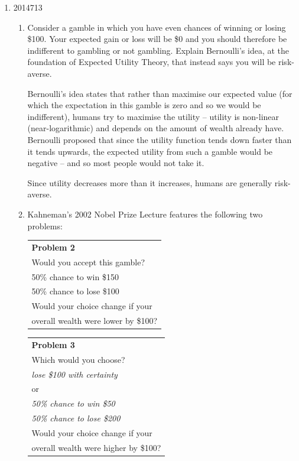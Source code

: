 \documentclass[10pt,\jkfside,a4paper]{article}
\begin{document}
\begin{enumerate}
\begin{enumerate}[label=(\alph*)]
\end{enumerate}

\item

\begin{examquestion}{2014}{7}{13}

\begin{enumerate}[label=(\alph*)]

\item Consider a gamble in which you have even chances of winning or losing
\$100. Your expected gain or loss will be \$0 and you should therefore be
indifferent to gambling or not gambling. Explain Bernoulli's idea, at the
foundation of Expected Utility Theory, that instead says you will be
risk-averse.

Bernoulli's idea states that rather than maximise our expected value (for which
the expectation in this gamble is zero and so we would be indifferent), humans
try to maximise the utility -- utility is non-linear (near-logarithmic) and depends
on the amount of wealth already have. Bernoulli proposed that since the utility
function tends down faster than it tends upwards, the expected utility from such a
gamble would be negative -- and so most people would not take it.

Since utility decreases more than it increases, humans are generally risk-averse.

\item Kahneman's 2002 Nobel Prize Lecture features the following two problems:

\begin{multicols}{2}

\begin{tabular}{|l|}
\hline 
\textbf{Problem 2} \\
Would you accept this gamble? \\
50\% chance to win \$150 \\
50\% chance to lose \$100 \\
Would your choice change if your \\
overall wealth were lower by \$100? \\
\hline
\end{tabular}

\begin{tabular}{|l|}
\hline 
\textbf{Problem 3} \\
Which would you choose? \\
\textit{lose \$100 with certainty} \\
or \\
\textit{50\% chance to win \$50} \\
\textit{50\% chance to lose \$200} \\
Would your choice change if your \\
overall wealth were higher by \$100? \\
\hline
\end{tabular}


\end{multicols}
\end{enumerate}
\end{examquestion}
\end{enumerate}
\end{document}
